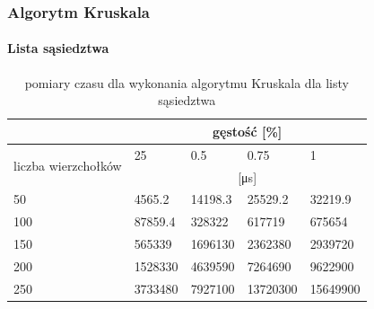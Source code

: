 \documentclass[11pt]{article}
\begin{document}
\subsubsection{Algorytm Kruskala}

\paragraph{Lista sąsiedztwa}
\begin{table}[H]
    \centering
    \begin{tabular}{|l|llll|}
        \hline
                                             & \multicolumn{4}{c|}{gęstość {[}\%{]}}                                                                           \\ \hline
        \multirow{2}{*}{liczba wierzchołków} & \multicolumn{1}{l|}{25}               & \multicolumn{1}{l|}{0.5}     & \multicolumn{1}{l|}{0.75}     & 1        \\ \cline{2-5}
                                             & \multicolumn{4}{c|}{[μs]}                                                                                       \\ \hline
        50                                   & \multicolumn{1}{l|}{4565.2}           & \multicolumn{1}{l|}{14198.3} & \multicolumn{1}{l|}{25529.2}  & 32219.9  \\ \hline
        100                                  & \multicolumn{1}{l|}{87859.4}          & \multicolumn{1}{l|}{328322}  & \multicolumn{1}{l|}{617719}   & 675654   \\ \hline
        150                                  & \multicolumn{1}{l|}{565339}           & \multicolumn{1}{l|}{1696130} & \multicolumn{1}{l|}{2362380}  & 2939720  \\ \hline
        200                                  & \multicolumn{1}{l|}{1528330}          & \multicolumn{1}{l|}{4639590} & \multicolumn{1}{l|}{7264690}  & 9622900  \\ \hline
        250                                  & \multicolumn{1}{l|}{3733480}          & \multicolumn{1}{l|}{7927100} & \multicolumn{1}{l|}{13720300} & 15649900 \\ \hline
    \end{tabular}
    \caption{pomiary czasu dla wykonania algorytmu Kruskala dla listy sąsiedztwa}
    \label{tab:my-table}
\end{table}
\end{document}
